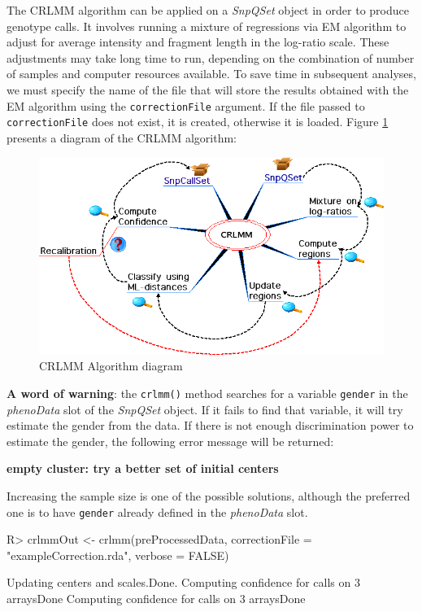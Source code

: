 \documentclass{article}
\newcommand{\Rmethod}[1]{{\texttt{#1}}}
\newcommand{\Robject}[1]{{\texttt{#1}}}
\newcommand{\Rclass}[1]{{\textit{#1}}}
\begin{document}
The CRLMM algorithm \cite{Carvalho2006} can be applied on a
\Rclass{SnpQSet} object in order to produce genotype calls. It involves
running a mixture of regressions via EM algorithm to adjust for average
intensity and fragment length in the log-ratio scale. These adjustments
may take long time to run, depending on the combination of number of
samples and computer resources available. To save time in subsequent
analyses, we must specify the name of the file that will store the
results obtained with the EM algorithm using the
\Robject{correctionFile} argument. If the file passed to
\Robject{correctionFile} does not exist, it is created, otherwise it is
loaded. Figure \ref{crlmm} presents a diagram of the CRLMM algorithm:

\begin{figure}[h]
  \centering
  \includegraphics[scale=.5]{crlmm.png}
  \caption{CRLMM Algorithm diagram}
  \label{crlmm}
\end{figure}

\textbf{A word of warning}: the \Rmethod{crlmm()} method searches for a
variable \Robject{gender} in the \Rclass{phenoData} slot of the
\Rclass{SnpQSet} object. If it fails to find that variable, it will try
estimate the gender from the data. If there is not enough discrimination
power to estimate the gender, the following error message will be
returned:

{\bf empty cluster: try a better set of initial centers}

Increasing the sample size is one of the possible solutions, although
the preferred one is to have \Robject{gender} already defined in the
\Rclass{phenoData} slot.

\begin{Schunk}
\begin{Sinput}
R> crlmmOut <- crlmm(preProcessedData, correctionFile = "exampleCorrection.rda", 
     verbose = FALSE)
\end{Sinput}
\begin{Soutput}
Updating centers and scales.Done.
Computing confidence for calls on  3  arraysDone
Computing confidence for calls on  3  arraysDone
\end{Soutput}
\end{Schunk}
\end{document}
